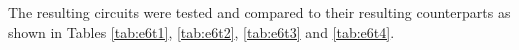 \documentclass[a4paper]{article}
\begin{document}
        The resulting circuits were tested and compared to their resulting counterparts as shown in
        Tables \ref{tab:e6t1}, \ref{tab:e6t2}, \ref{tab:e6t3} and \ref{tab:e6t4}.
        \begin{table}[ht]
            \begin{center}
                
            \end{center}
            \label{tab:e6t1}
        \end{table}
        \begin{table}[ht]
            \begin{center}
                
            \end{center}
            \label{tab:e6t2}
        \end{table}
        \begin{table}[ht]
            \begin{center}
                
            \end{center}
            \label{tab:e6t3}
        \end{table}
        \begin{table}[ht]
            \begin{center}
                
            \end{center}
            \label{tab:e6t4}
        \end{table}
    
\end{document}
